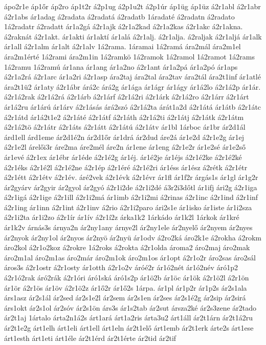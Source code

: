 {ápo2r1e
áp1őr
áp2ro
áp1t2r
á2p1ug
á2p1u2t
á2p1úr
áp1üg
áp1üz
á2r1abl
á2r1abr
á2r1abs
ár1adag
á2radata
á2radatá
á2radatb
1áradaté
á2radatn
á2radato
1á2radatr
á2radatt
ár1a2gá
á2r1ajk
á2r1a2kad
á2r1a2kas
á2r1akc
á2r1akna.
á2raknát
á2r1akt.
ár1akti
ár1aktí
ár1alá
á2r1alj.
á2r1alja.
á2raljak
á2r1aljá
ár1alk
ár1all
á2r1alm
ár1alt
á2r1alv
1á2rama.
1áramai
1á2ramá
ára2mál
ára2m1el
ára2m1érté
1á2rami
ára2m1in
1á2ramkö
1á2ramok
1á2ramol
1á2ramot
1á2rams
1á2ramu
1á2ramú
ár1ana
ár1ang
ár1a2no
á2r1ant
ár1a2pá
ár1a2pó
ár1aps
á2r1a2rá
á2r1arc
ár1a2ri
á2r1asp
ára2taj
ára2tal
ára2tav
ára2tál
ára2t1inf
ár1atlé
ára2t1ü2
ár1aty
á2r1ábr
árá2c
árá2g
ár1ága
ár1ágr
ár1ágy
ár1á2lo
á2r1á2p
ár1ár.
á2r1á2rak
á2r1á2rá
á2r1árb
á2r1árf
á2r1á2ri
á2r1árk
á2r1á2ro
á2r1árr
á2r1árt
ár1á2ru
ár1árú
ár1árv
á2r1ásás
árá2szó
á2r1á2ta
árát1a2d
á2r1átá
ár1átb
á2r1átc
á2r1átd
ár1á2t1e2
á2r1áté
á2r1átf
á2r1áth
á2r1á2ti
á2r1átj
á2r1átk
á2r1átm
á2r1á2tö
á2r1átr
á2r1áts
á2r1átt
á2r1átú
á2r1átv
ár1bl
1árboc
ár1br
ár2d1ál
árd1ell
árd1eme
ár2d1é2n
ár2d1őr
ár1drá
ár2dud
áre2á
ár1e2d
á2r1e2g
ár1ej
á2r1e2l
árelői3r
áre2ma
áre2mél
áre2n
ár1ene
ár1eng
á2r1e2r
ár1e2sé
ár1e2ső
ár1evé
á2r1ex
ár1ébr
ár1éde
á2r1é2g
ár1éj.
ár1é2je
ár1éjs
á2r1é2ke
á2r1é2ké
á2r1éks
á2r1é2l
á2r1é2ne
á2r1ép
á2r1éré
á2r1é2ri
ár1éss
ár1ész
á2rétk
á2r1étr
á2r1étt
á2r1étv
á2r1év.
áré2vek
á2r1évk
á2r1évr
ár1fl
ár1f2r
árgás1s
ár1gl
ár1g2r
ár2gyárv
ár2gyir
ár2gyol
ár2gyó
á2r1i2de
á2r1i2dé
á3r2i3dőtl
ár1ifj
ári2g
á2r1iga
á2r1igá
á2r1ige
á2r1ill
á2r1i2má
ár1imb
á2r1i2mi
á2rinas
á2r1inc
á2r1ind
á2r1inf
á2r1ing
ár1inn
á2r1int
á2r1inv
á2rio
á2r1i2paro
ári2s1e
ár1isko
ár1iste
ár1i2sza
á2r1i2ta
ár1i2zo
á2r1ír
ár1ív
á2r1í2z
árka1k2
1árkádo
ár1k2l
1árkok
ár1kré
ár1k2v
árnás3s
árnya2n
ár2ny1any
árnye2l
ár2ny1ele
ár2nyelő
ár2nyem
ár2nyes
ár2nyok
ár2ny1ol
ár2nyos
ár2nyö
ár2nyü
ár1odv
á2ro2ká
áro2k1e
á2rokha
á2rokm
áro2kol
á2r1o2koz
á2rokre
1á2roks
á2rokta
á2r1olda
ároma2
áro2maj
áro2mak
áro2m1al
áro2m1as
áro2már
áro2m1ok
áro2m1os
ár1opt
á2r1o2r
áro2sas
áro2sál
áros3s
á2r1ostr
á2r1osty
ár1otth
á2r1o2v
áróé2r
ár1ó2nét
ár1ó2név
áró1p2
á2r1ó2rak
áró2rák
á2r1óri
áró1ská
áró1s2p
ár1ö2b
ár1öc
ár1ök
á2r1ö2l
á2r1ön
ár1ör
á2r1ös
ár1öv
á2r1ö2z
ár1ő2r
ár1ő2s
1árpa.
ár1pl
ár1p2r
ár1p2s
ár2s1ala
árs1asz
ár2s1ál
ár2sed
ár2s1e2l
ár2sem
ár2s1en
ár2ses
ár2s1é2g
ár2sip
ár2sirá
árs1okt
ár2s1ol
ár2sóv
ár2s1ön
árs3s
ár1s2tab
ár2sut
ársza2ké
ár2s3zene
ár2tado
ár2t1aj
1ártalo
árta2n1á2s
árt1ará
árt1a2ris
árta3u2
árt1áll
ár2t1árn
ár2t1á2ru
ár2t1e2g
árt1elh
árt1eli
árt1ell
árt1eln
ár2t1elő
árt1emb
ár2t1erk
árte2s
árt1ese
árt1esth
árt1eti
árt1éle
ár2t1érd
ár2t1érte
ár2tid
ár2tif
}

